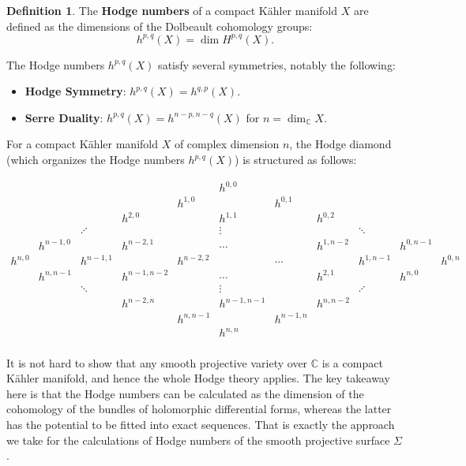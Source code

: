\documentclass{article}
\theoremstyle{definition}
\newtheorem{definition}[theorem]{Definition}
\begin{document}
\begin{definition}\label{DefHodgeNumbers}
The \textbf{Hodge numbers} of a compact Kähler manifold $X$ are defined as the dimensions of the Dolbeault cohomology groups:
$$h^{p,q}(X) = \dim H^{p,q}(X).$$
\end{definition}

The Hodge numbers $h^{p,q}(X)$ satisfy several symmetries, notably the following:
\begin{itemize}
    \item \textbf{Hodge Symmetry}: $h^{p,q}(X) = h^{q,p}(X)$.
    \item \textbf{Serre Duality}: $h^{p,q}(X) = h^{n-p,n-q}(X)$ for $n = \dim_\mathbb{C} X$.
\end{itemize}



For a compact Kähler manifold \( X \) of complex dimension \( n \), the Hodge diamond (which organizes the Hodge numbers \( h^{p,q}(X) \)) is structured as follows:

\[
\begin{array}{ccccccccccc}
 & & & & & h^{0,0} & & & & & \\
 & & & & h^{1,0} & & h^{0,1} & & & & \\
 & & & h^{2,0} & & h^{1,1} & & h^{0,2} & & & \\
 & & \iddots & & & \vdots & & & \ddots & & \\
 & h^{n-1,0} & & h^{n-2,1} & & \cdots & & h^{1,n-2} & & h^{0,n-1} & \\
 h^{n,0} & & h^{n-1,1} & & h^{n-2,2} & & \cdots & & h^{1,n-1} & & h^{0,n} \\
 & h^{n,n-1} & & h^{n-1,n-2} & & \cdots & & h^{2,1} & & h^{n,0} & \\
 & & \ddots & & & \vdots & & & \iddots & & \\
 & & & h^{n-2,n} & & h^{n-1,n-1} & & h^{n,n-2} & & & \\
 & & & & h^{n,n-1} & & h^{n-1,n} & & & & \\
 & & & & & h^{n,n} & & & & & \\
\end{array}
\]

It is not hard to show that any smooth projective variety over $\mathbb C$ is a compact Kähler manifold, and hence the whole Hodge theory applies. The key takeaway here is that the Hodge numbers can be calculated as the dimension of the cohomology of the bundles of holomorphic differential forms, whereas the latter has the potential to be fitted into exact sequences. That is exactly the approach we take for the calculations of Hodge numbers of the smooth projective surface $\Sigma$. 
\end{document}
